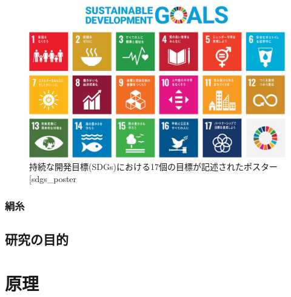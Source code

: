 \documentclass[dvipdfmx,12pt,a4paper]{jreport}
\makeatletter
\DeclareRobustCommand\cite{\unskip
    	\@ifnextchar[{\@tempswatrue\@citex}{\@tempswafalse\@citex[]}}
\makeatother
\begin{document}
		\begin{figure}[h]
			\centering
			\includegraphics[width=\linewidth]{sdgs_poster.jpg}
			\caption{持続な開発目標(SDGs)における17個の目標が記述されたポスター\cite{sdgs_poster}}
			\label{sdgs_poster}
		\end{figure}
		\newpage
		\subsection{絹糸}
		\section{研究の目的}

	\chapter{原理}
\end{document}

